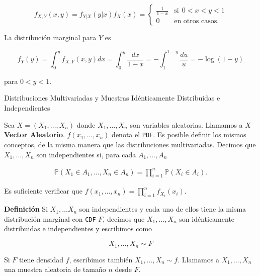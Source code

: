 \documentclass{article}\usepackage[]{graphicx}\usepackage[]{color}
\begin{document}
\[
f_{X,Y}(x,y) = f_{Y|X}(y|x)f_{X}(x) = \begin{cases}
\frac{1}{1 -x}& \mbox{si}\ \ 0 < x < y < 1 \\
0 & \mbox{en otros casos}.
\end{cases}
\]

\vspace{0.3cm}

La distribuci\'on marginal para $Y$ es

\[
f_{Y}(y) = \int_{0}^{y}f_{X,Y}(x,y)dx = \int_{0}^{y}\frac{dx}{1 -x} = -\int_{1}^{1- y}\frac{du}{u} = -\log(1-y)
\]

\vspace{0.3cm}

para $0 < y < 1$.

\vspace{0.8cm}

{\Large Distribuciones Multivariadas y Muestras Id\'enticamente Distribuidas e Independientes}

\vspace{0.5cm}

Sea $X = (X_1,\dots, X_n)$ donde $X_1, \dots, X_n$ son variables aleatorias. Llamamos a $X$ \textbf{Vector Aleatorio}. $f(x_1,\dots,x_n)$ denota el \texttt{PDF}. Es posible definir los mismos conceptos, de la misma manera que las distribuciones multivariadas. Decimos que $X_1,\dots, X_n$ son independientes si, para cada $A_1, \dots, A_n$

\begin{align}
\mathbb{P}(X_1 \in A_1,  \dots, X_n \in A_n) = \prod_{i=1}^{n}\mathbb{P}(X_i \in A_i).
\end{align}

\vspace{0.3cm}

Es suficiente verificar que $f(x_1,\dots, x_n) = \prod_{i = 1}^{n}f_{X_{i}}(x_i) $.


\vspace{0.5cm}

\textbf{Definici\'on} Si $X_1,\dots X_n$ son independientes y cada uno de ellos tiene la misma distribuci\'on marginal con \texttt{CDF} $F$, decimos que $X_1, \dots, X_n$ son id\'enticamente distribuidas e independientes y escribimos como

\vspace{0.3cm}

\[
X_1, \dots, X_n \sim F
\]

\vspace{0.3cm}

Si $F$ tiene densidad $f$, escribimos tambi\'en $X_1, \dots, X_n \sim f$. Llamamos a $X_1, \dots, X_n$ una muestra aleatoria de tama\~no $n$ desde $F$.
\end{document}
